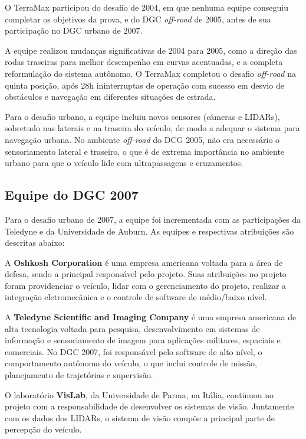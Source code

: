 O TerraMax participou do desafio de 2004, em que nenhuma equipe conseguiu completar os objetivos da prova, e do DGC \emph{off-road} de 2005, antes de sua participação no DGC urbano de 2007.

A equipe realizou mudanças significativas de 2004 para 2005, como a direção das rodas traseiras para melhor desempenho em curvas acentuadas, e a completa reformulação do sistema autônomo. O TerraMax completou o desafio \emph{off-road} na quinta posição, após 28h ininterruptas de operação com sucesso em desvio de obstáculos e navegação em diferentes situações de estrada.

Para o desafio urbano, a equipe incluiu novos sensores (câmeras e LIDARs), sobretudo nas laterais e na traseira do veículo, de modo a adequar o sistema para navegação urbana. No ambiente \emph{off-road} do DCG 2005, não era necessário o sensoriamento lateral e traseiro, o que é de extrema importância no ambiente urbano para que o veículo lide com ultrapassagens e cruzamentos.

\subsection{Equipe do DGC 2007}

Para o desafio urbano de 2007, a equipe foi incrementada com as participações da Teledyne e da Universidade de Auburn. As equipes e respectivas atribuições são descritas abaixo:

A \textbf{Oshkosh Corporation} é uma empresa americana voltada para a área de defesa, sendo a principal responsável pelo projeto. Suas atribuições no projeto foram providenciar o veículo, lidar com o gerenciamento do projeto, realizar a integração eletromecânica e o controle de software de médio/baixo nível.

A \textbf{Teledyne Scientific and Imaging Company} é uma empresa americana de alta tecnologia voltada para pesquisa, desenvolvimento em sistemas de informação e sensoriamento de imagem para aplicações militares, espaciais e comerciais. No DGC 2007, foi responsável pelo software de alto nível, o comportamento autônomo do veículo, o que inclui controle de missão, planejamento de trajetórias e supervisão.

O laboratório \textbf{VisLab}, da Universidade de Parma, na Itália, continuou no projeto com a responsabilidade de desenvolver os sistemas de visão. Juntamente com os dados dos LIDARs, o sistema de visão compõe a principal parte de percepção do veículo.

